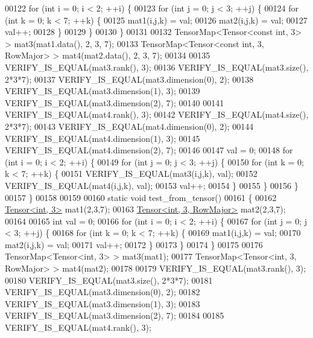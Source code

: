 \begin{DoxyCode}
00122   \textcolor{keywordflow}{for} (\textcolor{keywordtype}{int} i = 0; i < 2; ++i) \{
00123     \textcolor{keywordflow}{for} (\textcolor{keywordtype}{int} j = 0; j < 3; ++j) \{
00124       \textcolor{keywordflow}{for} (\textcolor{keywordtype}{int} k = 0; k < 7; ++k) \{
00125         mat1(i,j,k) = val;
00126         mat2(i,j,k) = val;
00127         val++;
00128       \}
00129     \}
00130   \}
00131 
00132   TensorMap<Tensor<const int, 3> > mat3(mat1.data(), 2, 3, 7);
00133   TensorMap<Tensor<const int, 3, RowMajor> > mat4(mat2.data(), 2, 3, 7);
00134 
00135   VERIFY\_IS\_EQUAL(mat3.rank(), 3);
00136   VERIFY\_IS\_EQUAL(mat3.size(), 2*3*7);
00137   VERIFY\_IS\_EQUAL(mat3.dimension(0), 2);
00138   VERIFY\_IS\_EQUAL(mat3.dimension(1), 3);
00139   VERIFY\_IS\_EQUAL(mat3.dimension(2), 7);
00140 
00141   VERIFY\_IS\_EQUAL(mat4.rank(), 3);
00142   VERIFY\_IS\_EQUAL(mat4.size(), 2*3*7);
00143   VERIFY\_IS\_EQUAL(mat4.dimension(0), 2);
00144   VERIFY\_IS\_EQUAL(mat4.dimension(1), 3);
00145   VERIFY\_IS\_EQUAL(mat4.dimension(2), 7);
00146 
00147   val = 0;
00148   \textcolor{keywordflow}{for} (\textcolor{keywordtype}{int} i = 0; i < 2; ++i) \{
00149     \textcolor{keywordflow}{for} (\textcolor{keywordtype}{int} j = 0; j < 3; ++j) \{
00150       \textcolor{keywordflow}{for} (\textcolor{keywordtype}{int} k = 0; k < 7; ++k) \{
00151         VERIFY\_IS\_EQUAL(mat3(i,j,k), val);
00152         VERIFY\_IS\_EQUAL(mat4(i,j,k), val);
00153         val++;
00154       \}
00155     \}
00156   \}
00157 \}
00158 
00159 
00160 \textcolor{keyword}{static} \textcolor{keywordtype}{void} test\_from\_tensor()
00161 \{
00162   \hyperlink{class_eigen_1_1_tensor}{Tensor<int, 3>} mat1(2,3,7);
00163   \hyperlink{class_eigen_1_1_tensor}{Tensor<int, 3, RowMajor>} mat2(2,3,7);
00164 
00165   \textcolor{keywordtype}{int} val = 0;
00166   \textcolor{keywordflow}{for} (\textcolor{keywordtype}{int} i = 0; i < 2; ++i) \{
00167     \textcolor{keywordflow}{for} (\textcolor{keywordtype}{int} j = 0; j < 3; ++j) \{
00168       \textcolor{keywordflow}{for} (\textcolor{keywordtype}{int} k = 0; k < 7; ++k) \{
00169         mat1(i,j,k) = val;
00170         mat2(i,j,k) = val;
00171         val++;
00172       \}
00173     \}
00174   \}
00175 
00176   TensorMap<Tensor<int, 3> > mat3(mat1);
00177   TensorMap<Tensor<int, 3, RowMajor> > mat4(mat2);
00178 
00179   VERIFY\_IS\_EQUAL(mat3.rank(), 3);
00180   VERIFY\_IS\_EQUAL(mat3.size(), 2*3*7);
00181   VERIFY\_IS\_EQUAL(mat3.dimension(0), 2);
00182   VERIFY\_IS\_EQUAL(mat3.dimension(1), 3);
00183   VERIFY\_IS\_EQUAL(mat3.dimension(2), 7);
00184 
00185   VERIFY\_IS\_EQUAL(mat4.rank(), 3);

\end{DoxyCode}

